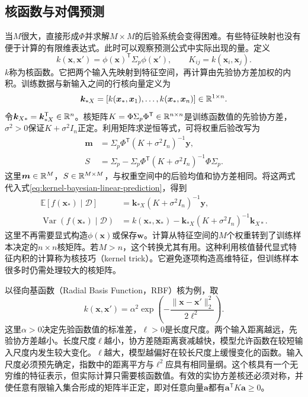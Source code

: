 \subsection{核函数与对偶预测}
当$M$很大，直接形成$\Phi$并求解$M\times M$的后验系统会变得困难。有些特征映射也没有便于计算的有限维表达式。此时可以观察预测公式中实际出现的量。定义
\begin{equation}
 k(\bm x,\bm x')
 =\phi(\bm x)^{\mathsf T}\Sigma_p\phi(\bm x'),
 \qquad
 K_{ij}=k(\bm x_i,\bm x_j).
 \label{eq:kernel-from-feature-map}
\end{equation}
$k$称为核函数。它把两个输入先映射到特征空间，再计算由先验协方差加权的内积。训练数据与新输入之间的行核向量定义为
\begin{equation}
 \bm k_{*X}=[k(\bm x_*,\bm x_1),\ldots,k(\bm x_*,\bm x_n)]\in\mathbb{R}^{1\times n}.
\end{equation}
令$\bm k_{X*}=\bm k_{*X}^{\mathsf T}\in\mathbb{R}^n$。核矩阵$K=\Phi\Sigma_p\Phi^{\mathsf T}\in\mathbb{R}^{n\times n}$是训练函数值的先验协方差，$\sigma^2>0$保证$K+\sigma^2I_n$正定。利用矩阵求逆恒等式，可将权重后验改写为
\begin{align}
 \bm m&=\Sigma_p\Phi^{\mathsf T}(K+\sigma^2I_n)^{-1}\bm y,\\
 S&=\Sigma_p-\Sigma_p\Phi^{\mathsf T}(K+\sigma^2I_n)^{-1}\Phi\Sigma_p.
\end{align}
这里$\bm m\in\mathbb{R}^M$，$S\in\mathbb{R}^{M\times M}$，与权重空间中的后验均值和协方差相同。将这两式代入式\eqref{eq:kernel-bayesian-linear-prediction}，得到
\begin{align}
 \mathbb E[f(\bm x_*)\mid\mathcal D]
 &=\bm k_{*X}(K+\sigma^2I_n)^{-1}\bm y,\\
 \operatorname{Var}(f(\bm x_*)\mid\mathcal D)
 &=k(\bm x_*,\bm x_*)
 -\bm k_{*X}(K+\sigma^2I_n)^{-1}\bm k_{X*}.
 \label{eq:kernel-bayesian-linear-dual-prediction}
\end{align}
这里不再需要显式构造$\phi(\bm x)$或保存$\bm w$。计算从特征空间的$M$个权重转到了训练样本决定的$n\times n$核矩阵。若$M>n$，这个转换尤其有用。这种利用核值替代显式特征内积的计算称为核技巧（kernel trick）。它避免逐项构造高维特征，但训练样本很多时仍需处理较大的核矩阵。

以径向基函数（Radial Basis Function，RBF）核为例，取
\begin{equation}
 k(\bm x,\bm x')=\alpha^2\exp\left(-\frac{\|\bm x-\bm x'\|_2^2}{2\ell^2}\right).
 \label{eq:gp-rbf-kernel}
\end{equation}
这里$\alpha>0$决定先验函数值的标准差，$\ell>0$是长度尺度。两个输入距离越远，先验协方差越小。长度尺度$\ell$越小，协方差随距离衰减越快，模型允许函数在较短输入尺度内发生较大变化。$\ell$越大，模型越偏好在较长尺度上缓慢变化的函数。输入尺度必须预先确定，指数中的距离平方与$\ell^2$应具有相同量纲。这个核具有一个无穷维的特征表示，但实际计算只需要核函数值。有效的实协方差核还必须对称，并使任意有限输入集合形成的矩阵半正定，即对任意向量$\bm a$都有$\bm a^{\mathsf T}K\bm a\geq0$。

